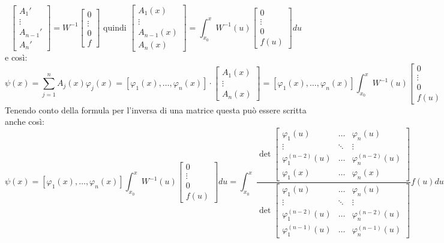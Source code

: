 \documentclass[a4paper,11pt,titlepage]{book}
\begin{document}
$$\begin{bmatrix}
A_1'\\
\vdots\\
A_{n-1}'\\
A_n'
\end{bmatrix}=W^{-1}\begin{bmatrix}
0\\ \vdots \\ 0 \\ f
\end{bmatrix} \mbox{ quindi }\begin{bmatrix}
A_1(x)\\
\vdots\\
A_{n-1}(x)\\
A_n(x)
\end{bmatrix}=\int_{x_0}^xW^{-1}(u)\begin{bmatrix}
0\\ \vdots \\ 0 \\ f(u)
\end{bmatrix} du$$
e così:
$$\psi(x)=\sum_{j=1}^n A_j(x)\varphi_j(x)=[\varphi_1(x),\ldots,\varphi_n(x)]\cdot\begin{bmatrix}
A_1(x)\\
\vdots\\
A_n(x)
\end{bmatrix}=[\varphi_1(x),\ldots,\varphi_n(x)]\int_{x_0}^xW^{-1}(u)\begin{bmatrix}
0\\ \vdots \\ 0 \\ f(u)
\end{bmatrix} du$$
Tenendo conto della formula per l'inversa di una matrice questa può essere scritta anche così:
$$\psi(x)=[\varphi_1(x),\ldots,\varphi_n(x)]\int_{x_0}^xW^{-1}(u)\begin{bmatrix}
0\\ \vdots \\ 0 \\ f(u)
\end{bmatrix} du=\int_{x_0}^x\frac{\det\begin{bmatrix}
\varphi_1(u) & \ldots & \varphi_n(u)  \\
\vdots & \ddots & \vdots \\
\varphi_1^{(n-2)}(u) & \ldots & \varphi_n^{(n-2)}(u)\\
\varphi_1(x) & \ldots & \varphi_n(x)\end{bmatrix}}{\det\begin{bmatrix}
\varphi_1(u) & \ldots & \varphi_n(u)  \\
\vdots & \ddots & \vdots \\
\varphi_1^{(n-2)}(u) & \ldots & \varphi_n^{(n-2)}(u)\\
\varphi_1^{(n-1)}(u) & \ldots & \varphi_n^{(n-1)}(u)\end{bmatrix}}f(u)du$$
\end{document}
